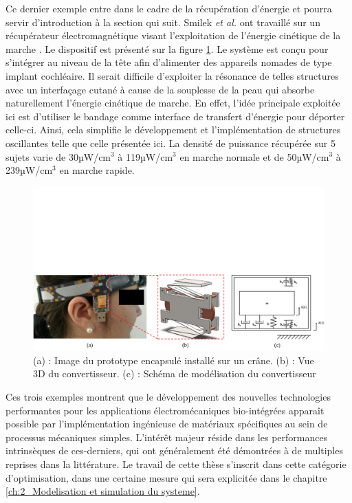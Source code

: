 Ce dernier exemple entre dans le cadre de la récupération d'énergie et pourra servir d'introduction à la section qui suit. Smilek \emph{et al.} ont travaillé sur un récupérateur électromagnétique visant l'exploitation de l'énergie cinétique de la marche \cite{Smilek2016}. Le dispositif est présenté sur la figure \ref{fig:kinetic_energy_head_head}. Le système est conçu pour s'intégrer au niveau de la tête afin d'alimenter des appareils nomades de type implant cochléaire. Il serait difficile d'exploiter la résonance de telles structures avec un interfaçage cutané à cause de la souplesse de la peau qui absorbe naturellement l'énergie cinétique de marche. En effet, l'idée principale exploitée ici est d'utiliser le bandage comme interface de transfert d'énergie pour déporter celle-ci. Ainsi, cela simplifie le développement et l'implémentation de structures oscillantes telle que celle présentée ici. La densité de puissance récupérée sur 5 sujets varie de 30µW/cm$^3$ à 119µW/cm$^3$ en marche normale et de 50µW/cm$^3$ à 239µW/cm$^3$ en marche rapide.
\begin{figure}[!htbp]
	\centering
	\captionsetup{justification=centering}
	\includegraphics[trim={0cm 0cm 0cm 10cm},clip,width=\textwidth]{../Chap1/Figure/kinetic_energy_head.pdf}
	\caption{(a) : Image du prototype encapsulé installé sur un crâne. (b) : Vue 3D du convertisseur. (c) : Schéma de modélisation du convertisseur \cite{Smilek2016}}
	\label{fig:kinetic_energy_head_head}
\end{figure}

Ces trois exemples montrent que le développement des nouvelles technologies performantes pour les applications électromécaniques bio-intégrées apparaît possible par l'implémentation ingénieuse de matériaux spécifiques au sein de processus mécaniques simples. L'intérêt majeur réside dans les performances intrinsèques de ces-derniers, qui ont généralement été démontrées à de multiples reprises dans la littérature. Le travail de cette thèse s'inscrit dans cette catégorie d'optimisation, dans une certaine mesure qui sera explicitée dans le chapitre \ref{ch:2_Modelisation et simulation du systeme}.

